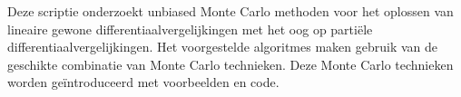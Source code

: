 Deze scriptie onderzoekt unbiased Monte Carlo methoden voor
het oplossen van lineaire gewone differentiaalvergelijkingen met het
oog op partiële differentiaalvergelijkingen.
Het voorgestelde algoritmes maken gebruik van de geschikte
combinatie van Monte Carlo technieken. Deze Monte Carlo technieken
worden geïntroduceerd met voorbeelden en code.